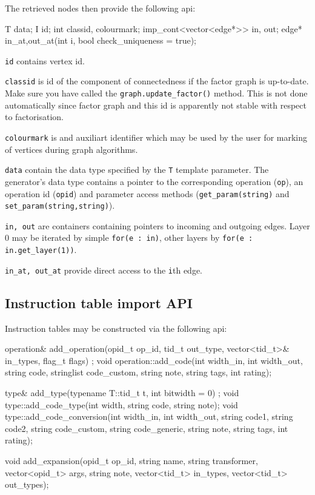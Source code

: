 The retrieved nodes then provide the following api:
\begin{code}
T data; I id;
int classid, colourmark; 
imp_cont<vector<edge*>> in, out;
edge* in_at,out_at(int i, bool check_uniqueness = true);
\end{code}

\begin{description}
  \item \texttt{id} contains vertex id.
  \item \texttt{classid} is id of the component of connectedness if the factor graph is up-to-date. Make sure you have called the \texttt{graph.update\_factor()} method. This is not done automatically since factor graph and this id is apparently not stable with respect to factorisation.
  \item \texttt{colourmark} is and auxiliart identifier which may be used by the user for marking of vertices during graph algorithms.
  \item \texttt{data} contain the data type specified by the \texttt{T} template parameter. The generator's data type contains a pointer to the corresponding operation (\texttt{op}), an operation id (\texttt{opid}) and parameter access methods (\texttt{get\_param(string)} and \texttt{set\_param(string,string)}). 
  \item \texttt{in, out} are containers containing pointers to incoming and outgoing edges. Layer 0 may be iterated by simple \texttt{for(e : in)}, other layers by \texttt{for(e : in.get\_layer(1))}.
  \item \texttt{in\_at, out\_at} provide direct access to the \texttt{i}th edge.
\end{description}

\subsection{Instruction table import API}

Instruction tables may be constructed via the following api:

\begin{code}
operation& add_operation(opid_t op_id, tid_t out_type, 
  vector<tid_t>& in_types, flag_t flags) ;
void operation::add_code(int width_in, int width_out, string code, 
  stringlist code_custom, string note, string tags, int rating);

type& add_type(typename T::tid_t t, int bitwidth = 0) ;
void type::add_code_type(int width, string code, string note);
void type::add_code_conversion(int width_in, int width_out, 
  string code1, string code2, string code_custom, 
  string code_generic, string note, string tags, int rating);

void add_expansion(opid_t op_id, string name, string transformer, 
  vector<opid_t> args, string note, vector<tid_t> in_types, 
  vector<tid_t> out_types);
\end{code}


